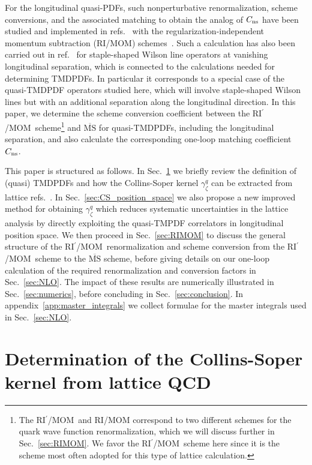 \documentclass[11pt,a4paper]{article}
\DeclareRobustCommand{\app}[1]{appendix~\ref{app:#1}}
\DeclareRobustCommand{\sec}[1]{Sec.~\ref{sec:#1}}
\DeclareRobustCommand{\mycite}[1]{ref.~\cite{#1}}
\DeclareRobustCommand{\mycites}[1]{refs.~\cite{#1}}
\newcommand{\MS}{{\overline{\mathrm{MS}}}}
\newcommand{\ns}{{\rm ns}}
\newcommand{\RIpMOM}{RI$^\prime$/MOM}
\begin{document}
For the longitudinal quasi-PDFs, such nonperturbative renormalization, scheme conversions, and the associated matching to obtain the analog of $C_\ns$ have been studied and implemented in \mycites{Constantinou:2017sej,Alexandrou:2017huk,Chen:2017mzz,Stewart:2017tvs,Liu:2018uuj} with the regularization-independent momentum subtraction (RI/MOM) schemes~\cite{Martinelli:1994ty}.
Such a calculation has also been carried out in \mycite{Constantinou:2019vyb} for staple-shaped Wilson line operators at vanishing longitudinal separation, 
which is connected to the calculations needed for determining TMDPDFs.
In particular it corresponds to a special case of the quasi-TMDPDF operators studied here, which will involve staple-shaped Wilson lines but with an additional separation along the longitudinal direction.
In this paper, we determine the scheme conversion coefficient between the \RIpMOM~scheme\footnote{The \RIpMOM\ and RI/MOM correspond to two different schemes for the quark wave function renormalization, which we will discuss further in \sec{RIMOM}. We favor the \RIpMOM\ scheme here since it is the scheme most often adopted for this type of lattice calculation.} and $\MS$ for quasi-TMDPDFs, including the longitudinal separation,
and also calculate the corresponding one-loop matching coefficient $C_\ns$.


This paper is structured as follows.
In \sec{CS_Lattice} we briefly review the definition of (quasi) TMDPDFs and how the Collins-Soper kernel $\gamma_\zeta^q$ can be extracted from lattice \mycites{Ebert:2018gzl,Ebert:2019okf}.
In \sec{CS_position_space} we also propose a new improved method for obtaining $\gamma_\zeta^q$ which reduces systematic uncertainties in the lattice analysis by directly exploiting the quasi-TMPDF correlators in longitudinal position space.
We then proceed in \sec{RIMOM} to discuss the general structure of the \RIpMOM~renormalization and scheme conversion from the \RIpMOM~scheme to the $\MS$ scheme, before giving details on our one-loop calculation of the required renormalization and conversion factors in \sec{NLO}. The impact of these results are numerically illustrated in \sec{numerics}, before concluding in \sec{conclusion}. In \app{master_integrals} we collect formulae for the master integrals used in \sec{NLO}.


\section{Determination of the Collins-Soper kernel from lattice QCD}
\label{sec:CS_Lattice}
\end{document}
